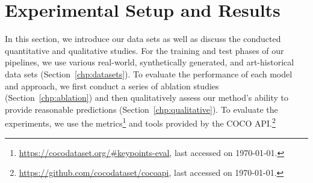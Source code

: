 \documentclass[sigconf]{acmart}
\begin{document}
\section{Experimental Setup and Results}
\label{chp:exp}

In this section, we introduce our data sets as well as discuss the conducted quantitative and qualitative studies. For the training and test phases of our pipelines, we use various real-world, synthetically generated, and art-historical data sets (Section~\ref{chp:datasets}). To evaluate the performance of each model and approach, we first conduct a series of ablation studies (Section~\ref{chp:ablation}) and then qualitatively assess our method's ability to provide reasonable predictions (Section~\ref{chp:qualitative}). To evaluate the experiments, we use the metrics\footnote{\url{https://cocodataset.org/\#keypoints-eval}, last accessed on \today.} and tools provided by the COCO API.\footnote{\url{https://github.com/cocodataset/cocoapi}, last accessed on \today.}
\end{document}
